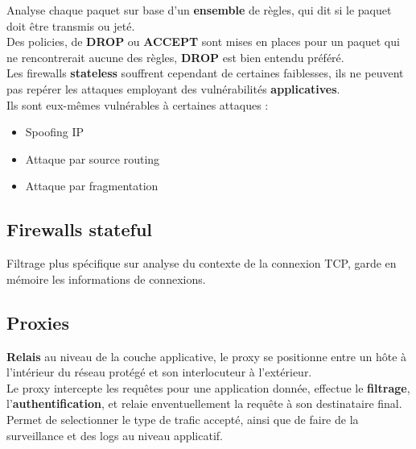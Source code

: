 \documentclass{report}
\begin{document}
			Analyse chaque paquet sur base d'un \textbf{ensemble} de règles, qui dit si le paquet doit être transmis ou jeté.\\

			Des policies, de \textbf{DROP} ou \textbf{ACCEPT} sont mises en places pour un paquet qui ne rencontrerait aucune des règles, \textbf{DROP} est bien entendu préféré.\\

			Les firewalls \textbf{stateless} souffrent cependant de certaines faiblesses, ils ne peuvent pas repérer les attaques employant des vulnérabilités \textbf{applicatives}.\\

			Ils sont eux-mêmes vulnérables à certaines attaques : \\

			\begin{itemize}
				\item Spoofing IP
				\item Attaque par source routing
				\item Attaque par fragmentation\\
			\end{itemize}

		\subsection{Firewalls stateful}

			Filtrage plus spécifique sur analyse du contexte de la connexion TCP, garde en mémoire les informations de connexions.\\

		\subsection{Proxies}

			\textbf{Relais} au niveau de la couche applicative, le proxy se positionne entre un hôte à l'intérieur du réseau protégé et son interlocuteur à l'extérieur.\\

			Le proxy intercepte les requêtes pour une application donnée, effectue le \textbf{filtrage}, l'\textbf{authentification}, et relaie enventuellement la requête à son destinataire final.\\

			Permet de selectionner le type de trafic accepté, ainsi que de faire de la surveillance et des logs au niveau applicatif.\\
\end{document}
